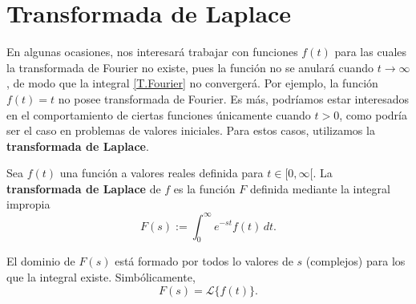 







\section{Transformada de Laplace}

En algunas ocasiones, nos interesará trabajar con funciones $f(t)$ para las cuales la transformada de Fourier no existe, pues la función no se anulará cuando $t \to \infty$, de modo que la integral \eqref{T.Fourier} no convergerá. Por ejemplo, la función $f(t) = t$ no posee transformada de Fourier. Es más, podríamos estar interesados en el comportamiento de ciertas funciones únicamente cuando $t > 0$, como podría ser el caso en problemas de valores iniciales. Para estos casos, utilizamos la \textbf{transformada de Laplace}.


\begin{defi}
Sea $f(t)$ una función a valores reales definida para $t \in [0, \infty[$. La \textbf{transformada de Laplace} de $f$ es la función $F$ definida mediante la integral impropia
$$F(s) := \int_0^{\infty} e^{-st} f(t) \,dt.$$

El dominio de $F(s)$ está formado por todos lo valores de $s$ (complejos) para los que la integral existe. Simbólicamente,
$$F(s) = \mathcal{L}\{f(t)\}.$$
\end{defi}

